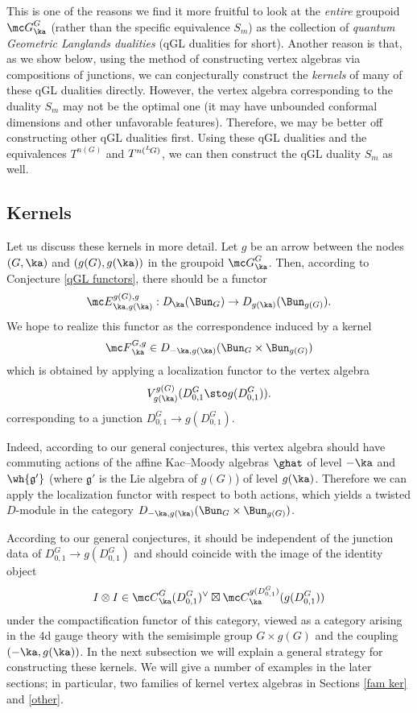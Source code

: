 \documentclass[11pt,reqno]{amsart}
\theoremstyle{plain}
\numberwithin{equation}{section}
\newcommand{\g}{\mathfrak{g}}
\def\neg{\negthinspace}
\def\LG{{}^L\neg G}
\theoremstyle{definition}
\begin{document}
This is one of the reasons we find it more fruitful to look at the
{\em entire} groupoid ${\mc G}^G_\ka$ (rather than the specific
equivalence $S_m$) as the collection of {\em quantum Geometric
  Langlands dualities} (qGL dualities for short). Another reason is
that, as we show below, using the method of constructing vertex
algebras via compositions of junctions, we can conjecturally construct
the {\em kernels} of many of these qGL dualities directly. However,
the vertex algebra corresponding to the duality $S_m$ may not be the
optimal one (it may have unbounded conformal dimensions and other
unfavorable features). Therefore, we may be better off constructing
other qGL dualities first. Using these qGL dualities and the
equivalences $T^{n(G)}$ and $T^{n(\LG)}$, we can then construct the
qGL duality $S_m$ as well.

\subsection{Kernels}

Let us discuss these kernels in more detail. Let $g$ be an arrow
between the nodes $(G,\ka)$ and $(g(G),g(\ka))$ in the groupoid ${\mc
  G}^G_\ka$. Then, according to Conjecture \ref{qGL functors}, there
should be a functor
$$
{\mc E}^{g(G),g}_{\ka,g(\ka)}: D_\ka(\Bun_G) \to
D_{g(\ka)}(\Bun_{g(G)}).
$$
We hope to realize this functor as the correspondence induced by a
kernel
$$
{\mc F}^{G,g}_\ka \in D_{-\ka,g(\ka)}(\Bun_G \times \Bun_{g(G)})
$$
which is obtained by applying a localization functor to the vertex
algebra
$$
V^{g(G)}_{g(\ka)}(D^G_{0,1}\sto g(D^G_{0,1})).
$$
corresponding to a junction $D^G_{0,1}\to g(D^G_{0,1})$.

Indeed, according to our general conjectures, this vertex algebra
should have commuting actions of the affine Kac--Moody algebras $\ghat$
of level $-\ka$ and $\wh{\g'}$ (where $\g'$ is the Lie algebra of
$g(G)$) of level $g(\ka)$. Therefore we can apply the localization
functor with respect to both actions, which yields a twisted
$D$-module in the category $D_{-\ka,g(\ka)}(\Bun_G \times
\Bun_{g(G)})$.

According to our general conjectures, it should be independent of the
junction data of $D^G_{0,1}\to g(D^G_{0,1})$ and should coincide with
the image of the identity object
$$
I \otimes I \in {\mc
  C}^G_\ka(D^G_{0,1})^\vee \boxtimes {\mc
  C}^{g(D^G_{0,1})}_\ka(g(D^G_{0,1}))
$$
under the compactification functor of this category, viewed as a
category arising in the 4d gauge theory with the semisimple group $G
\times g(G)$ and the coupling $(-\ka,g(\ka))$. In the next subsection
we will explain a general strategy for constructing these kernels. We
will give a number of examples in the later sections; in particular,
two families of kernel vertex algebras in Sections \ref{fam ker} and
\ref{other}.
\end{document}
